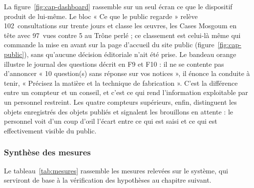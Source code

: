 La figure~\ref{fig:cap-dashboard} rassemble sur un seul écran ce que le
dispositif produit de lui-même. Le bloc « Ce que le public regarde » relève
102~consultations sur trente jours et classe les œuvres, les Cases Mosgoum en
tête avec 97~vues contre 5 au Trône perlé ; ce classement est celui-là même qui
commande la mise en avant sur la page d'accueil du site public
(figure~\ref{fig:cap-public}), sans qu'aucune décision éditoriale n'ait été
prise. Le bandeau orange illustre le journal des questions décrit en F9 et F10 :
il ne se contente pas d'annoncer « 10 question(s) sans réponse sur vos
notices », il énonce la conduite à tenir, « Précisez la matière et la technique
de fabrication ». C'est la différence entre un compteur et un conseil, et c'est
ce qui rend l'information exploitable par un personnel restreint. Les quatre
compteurs supérieurs, enfin, distinguent les objets enregistrés des objets
publiés et signalent les brouillons en attente : le personnel voit d'un coup
d'œil l'écart entre ce qui est saisi et ce qui est effectivement visible du
public.

\subsubsection{Synthèse des mesures}

Le tableau~\ref{tab:mesures} rassemble les mesures relevées sur le système, qui
serviront de base à la vérification des hypothèses au chapitre suivant.

